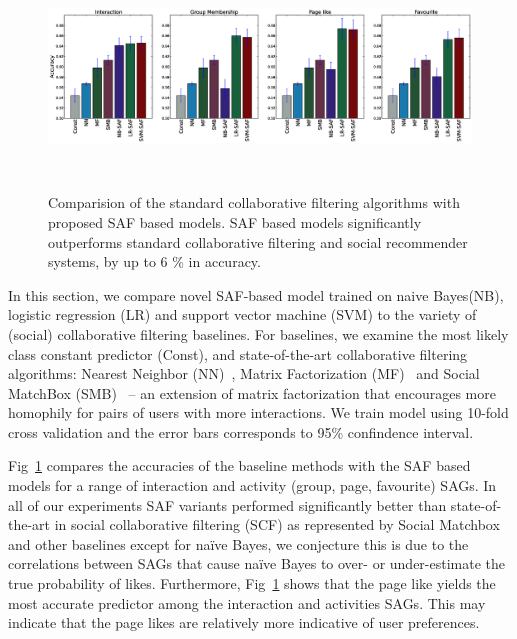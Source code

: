 \begin{figure}[tbp!]
\hspace{-6mm}\includegraphics[width=180mm,height=60mm]{data/plots/accuracy/accuracy.eps}
\caption{  Comparision of the standard collaborative filtering algorithms with proposed SAF based models.  SAF based models significantly outperforms standard collaborative filtering and social recommender systems, by up to 6 \% in accuracy. }
\label{Fig1}
\end{figure}

In this section, we compare novel SAF-based model trained on naive Bayes(NB), 
logistic regression (LR) and support vector machine (SVM) to the variety of
(social) collaborative filtering baselines. For baselines, we examine the most 
likely class constant predictor (Const), and state-of-the-art collaborative 
filtering algorithms: Nearest Neighbor (NN)~\cite{bellkor}, Matrix Factorization (MF)~\cite{pmf} 
and Social MatchBox (SMB)~\cite{Noel2012NOF} -- an extension of matrix
factorization that encourages more homophily for pairs of users with
more interactions. 
We train model using 10-fold cross validation and the error bars corresponds to 95\% confindence interval.

Fig~\ref{Fig1} compares the accuracies of the baseline methods 
with the SAF based models for a range of interaction and activity (group,
page, favourite) SAGs.  In all of our experiments SAF variants
performed significantly better than state-of-the-art in social
collaborative filtering (SCF) as represented by Social
Matchbox~\cite{Noel2012NOF} and other baselines except for na\"{i}ve Bayes, 
we conjecture this is due to the correlations between SAGs that cause na\"{i}ve
Bayes to over- or under-estimate the true probability of likes. Furthermore, Fig~\ref{Fig1} 
shows that the page like yields the most accurate predictor among the interaction and activities SAGs.
This may indicate that the page likes are relatively more indicative of user preferences.

